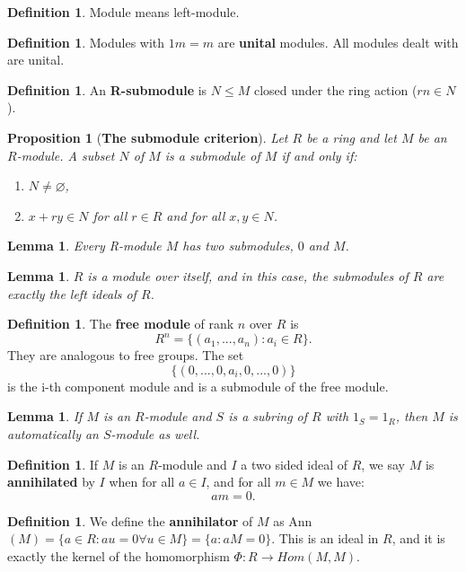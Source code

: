 \documentclass[12pt]{amsbook}
\let\emptyset\varnothing
\theoremstyle{plain}
\numberwithin{section}{chapter}
\numberwithin{equation}{chapter}
\newtheorem{lem}[theorem]{Lemma}
\newtheorem{Prop}[theorem]{Proposition}
\theoremstyle{definition}
\newtheorem{Def}[theorem]{Definition}
\theoremstyle{remark}
\renewcommand{\leq}{\leqslant}
\begin{document}
\begin{Def}
Module means left-module. 
\end{Def}

\begin{Def}
Modules with $1m = m$ are \textbf{unital} modules. All modules dealt with are unital. 
\end{Def}

\begin{Def}
An \textbf{R-submodule} is $N \leq M$ closed under the ring action ($rn \in N$). 
\end{Def}

\begin{Prop}[\textbf{The submodule criterion}]
Let $R$ be a ring and let $M$ be an $R$-module. A subset $N$ of $M$ is a submodule of $M$ if and only if:
\begin{enumerate}
\item $N \neq \emptyset $,
\item $x + ry \in N$ for all $r \in R$ and for all $x,y\in N$. 
\end{enumerate}
\end{Prop}

\begin{lem}
Every R-module $M$ has two submodules, $0$ and $M$. 
\end{lem}

\begin{lem}
$R$ is a module over itself, and in this case, the submodules of $R$ are exactly the left ideals of $R$. 
\end{lem}

\begin{Def}
The \textbf{free module} of rank $n$ over $R$ is 
$$
R^n = \{(a_1,...,a_n): a_i \in R\}.
$$
They are analogous to free groups. The set 
$$
\{(0,...,0,a_i,0,...,0)\}
$$
is the i-th component module and is a submodule of the free module. 
\end{Def}

\begin{lem}
If $M$ is an $R$-module and $S$ is a subring of $R$ with $1_S = 1_R$, then $M$ is automatically an $S$-module as well. 
\end{lem}

\begin{Def}
If $M$ is an $R$-module and $I$ a two sided ideal of $R$, we say $M$ is \textbf{annihilated} by $I$ when for all $a \in I$, and for all $m \in M$ we have:
$$
am = 0. 
$$
\end{Def}

\begin{Def}\label{annihilator1}
We define the \textbf{annihilator} of $M$ as Ann$(M) = \{a \in R: au = 0 \forall u \in M\} = \{a:aM = 0\}$. This is an ideal in $R$, and it is exactly the kernel of the homomorphism $\Phi:R \to Hom(M,M)$. 
\end{Def}
\end{document}
